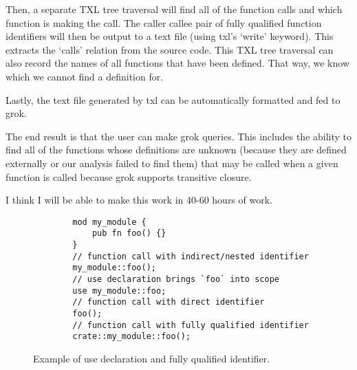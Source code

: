 \documentclass[11pt]{article}
\begin{document}
Then, a separate TXL tree traversal will find all of the function calls and which function is making the call.
The caller callee pair of fully qualified function identifiers will then be output to a text file (using txl's `write' keyword).
This extracts the `calls' relation from the source code.
This TXL tree traversal can also record the names of all functions that have been defined.
That way, we know which we cannot find a definition for.

Lastly, the text file generated by txl can be automatically formatted and fed to grok.

The end result is that the user can make grok queries.
This includes the ability to find all of the functions whose definitions are unknown (because they are defined externally or our analysis failed to find them) that may be called when a given function is called because grok supports transitive closure.



I think I will be able to make this work in 40-60 hours of work.





\begin{figure}
    \caption{Example of use declaration and fully qualified identifier.}
    \begin{lstlisting}
        mod my_module {
            pub fn foo() {}
        }
        // function call with indirect/nested identifier
        my_module::foo();
        // use declaration brings `foo` into scope
        use my_module::foo;
        // function call with direct identifier
        foo();
        // function call with fully qualified identifier
        crate::my_module::foo();
    \end{lstlisting}
\end{figure}
\end{document}
